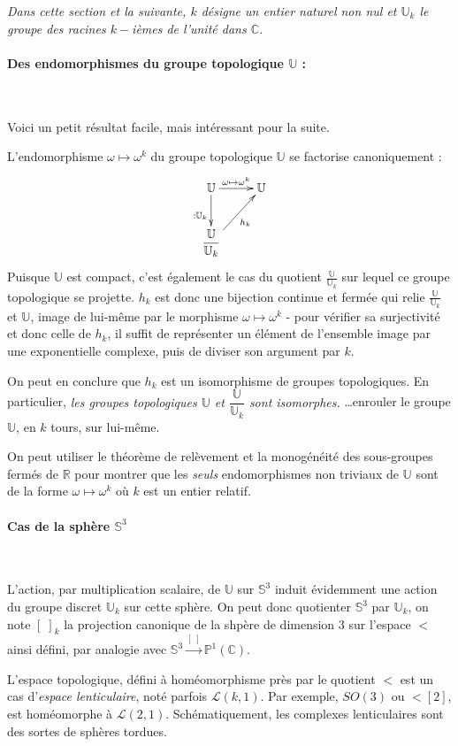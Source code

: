 \emph{Dans cette section et la suivante, $k$ d\'esigne un entier naturel non nul et $\mathbb{U}_k$ le groupe des racines $k-$i\`emes de l'unit\'e dans $\mathbb{C}$.}

\paragraph{Des endomorphismes du groupe topologique $\mathbb{U}$ :}~\\
\par
Voici un petit r\'esultat facile, mais int\'eressant pour la suite.
\par
L'endomorphisme $\omega\mapsto\omega^k$ du groupe topologique $\mathbb{U}$ se factorise canoniquement :
\[\xymatrix{%
\mathbb{U} \ar[r]^{\omega\mapsto\omega^k} \ar[d]_{:\mathbb{U}_k}&\mathbb{U}\\%
\dfrac{\mathbb{U}}{\mathbb{U}_k} \ar[ru]_{h_k}&%
}\]%
Puisque $\mathbb{U}$ est compact, c'est \'egalement le cas du quotient $\frac{\mathbb{U}}{\mathbb{U}_k}$ sur lequel ce groupe topologique se projette. %
$h_k$ est donc une bijection continue et ferm\'ee qui relie $\frac{\mathbb{U}}{\mathbb{U}_k}$ et $\mathbb{U}$, %
image de lui-m\^eme par le morphisme $\omega\mapsto\omega^k$ - pour v\'erifier sa surjectivit\'e et donc celle de $h_k$, il suffit de repr\'esenter un \'el\'ement de l'ensemble image par une exponentielle complexe, %
puis de diviser son argument par $k$.
\par
On peut en conclure que $h_k$ est un isomorphisme de groupes topologiques. En particulier, %
\emph{%
les groupes topologiques $\mathbb{U}$ et $\dfrac{\mathbb{U}}{\mathbb{U}_k}$ sont isomorphes.%
}
\ligneinter
\dots enrouler le groupe $\mathbb{U}$, en $k$ tours, sur lui-m\^eme.

\begin{rema}
On peut utiliser le th\'eor\`eme de rel\`evement et la monog\'en\'eit\'e des sous-groupes ferm\'es de $\mathbb{R}$ pour montrer que les \emph{seuls} %
endomorphismes non triviaux de $\mathbb{U}$ sont de la forme $\omega\mapsto\omega^k$ o\`u $k$ est un entier relatif.
\end{rema}

\paragraph{Cas de la sph\`ere $\mathbb{S}^3$}~\\
\par
L'action, par multiplication scalaire, de $\mathbb{U}$ sur $\mathbb{S}^3$ induit \'evidemment une action du groupe discret $\mathbb{U}_k$ sur cette sph\`ere. %
On peut donc quotienter $\mathbb{S}^3$ par $\mathbb{U}_k$, on note $[\; ]_k$ la projection canonique de la shp\`ere de dimension $3$ sur l'espace $\lt$ ainsi d\'efini, %
par analogie avec $\mathbb{S}^3\xrightarrow{[\; ]}\mathbb{P}^1(\mathbb{C})$.
\par
L'espace topologique, d\'efini \`a hom\'eomorphisme pr\`es par le quotient $\lt$ est un cas d'\emph{espace lenticulaire}, not\'e parfois $\mathcal{L}(k,1)$. %
Par exemple, $SO(3)$ ou $\lt[2]$, est hom\'eomorphe \`a $\mathcal{L}(2,1)$. Sch\'ematiquement, les complexes lenticulaires sont des sortes de \og{}sph\`eres tordues\fg{}.

